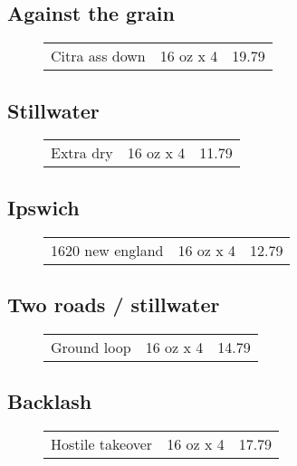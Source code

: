 \documentclass{article}%
\begin{document}
\begin{multicols}{3}
%
\subsection*{Against the grain}%
\begin{description}%
\item[]%
\begin{tabular}{l c r}%
Citra ass down&16 oz x 4&19.79\\%
\end{tabular}%
\end{description}

%
\subsection*{Stillwater}%
\begin{description}%
\item[]%
\begin{tabular}{l c r}%
Extra dry&16 oz x 4&11.79\\%
\end{tabular}%
\end{description}

%
\subsection*{Ipswich}%
\begin{description}%
\item[]%
\begin{tabular}{l c r}%
1620 new england&16 oz x 4&12.79\\%
\end{tabular}%
\end{description}

%
\subsection*{Two roads / stillwater}%
\begin{description}%
\item[]%
\begin{tabular}{l c r}%
Ground loop&16 oz x 4&14.79\\%
\end{tabular}%
\end{description}

%
\subsection*{Backlash}%
\begin{description}%
\item[]%
\begin{tabular}{l c r}%
Hostile takeover&16 oz x 4&17.79\\%
\end{tabular}%
\end{description}


\end{multicols}
\end{document}
